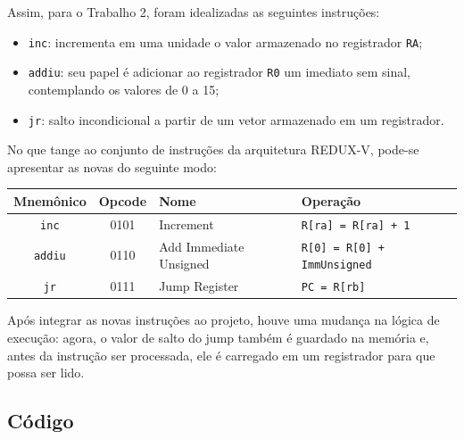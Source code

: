 \documentclass[twocolumn, 11pt]{article}
\begin{document}
Assim, para o Trabalho 2, foram idealizadas as seguintes instruções:

\begin{itemize}
    \item \texttt{inc}: incrementa em uma unidade o valor armazenado no registrador \texttt{RA};
    \item \texttt{addiu}: seu papel é adicionar ao registrador \texttt{R0} um imediato sem sinal, contemplando os valores de 0 a 15;
    \item \texttt{jr}: salto incondicional a partir de um vetor armazenado em um registrador.
\end{itemize}

No que tange ao conjunto de instruções da arquitetura REDUX-V, pode-se apresentar as novas do seguinte modo:

\begin{center}
\renewcommand{\arraystretch}{1.1} %
\setlength{\tabcolsep}{2pt} %
\begin{tabular}{|c|c|p{2cm}|p{3cm}|}
\hline
\textbf{Mnemônico} & \textbf{Opcode} & \textbf{Nome} & \textbf{Operação} \\ \hline
\texttt{inc} & 0101 & Increment & \texttt{R[ra] = R[ra] + 1} \\ \hline
\texttt{addiu} & 0110 & Add Immediate Unsigned & \texttt{R[0] = R[0] + ImmUnsigned} \\ \hline
\texttt{jr} & 0111 & Jump Register & \texttt{PC = R[rb]} \\ \hline
\end{tabular}
\end{center}

Após integrar as novas instruções ao projeto, houve uma mudança na lógica de execução: agora, o valor de salto do jump também é guardado na memória e, antes da instrução ser processada, ele é carregado em um registrador para que possa ser lido.

\subsection{Código}
\end{document}
